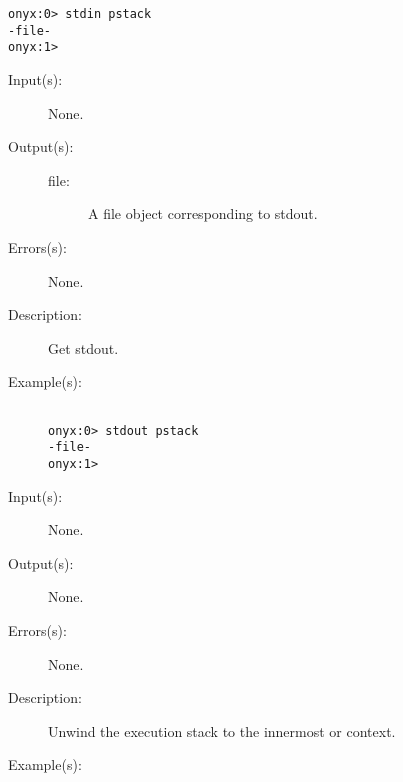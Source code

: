 \begin{description}
\begin{description}
\begin{verbatim}
onyx:0> stdin pstack
-file-
onyx:1>
		\end{verbatim}
	\end{description}
\label{systemdict:stdout}
\item[{\onyxop{--}{stdout}{file}}: ]
	\begin{description}\item[]
	\item[Input(s): ] None.
	\item[Output(s): ]
		\begin{description}\item[]
		\item[file: ]
			A file object corresponding to stdout.
		\end{description}
	\item[Errors(s): ] None.
	\item[Description: ]
		Get stdout.
	\item[Example(s): ]\begin{verbatim}

onyx:0> stdout pstack
-file-
onyx:1>
		\end{verbatim}
	\end{description}
\label{systemdict:stop}
\item[{\onyxop{--}{stop}{--}}: ]
	\begin{description}\item[]
	\item[Input(s): ] None.
	\item[Output(s): ] None.
	\item[Errors(s): ] None.
	\item[Description: ]
		Unwind the execution stack to the innermost
		 or
		 context.
	\item[Example(s): ]\begin{verbatim}


\end{verbatim}
\end{description}
\end{description}
